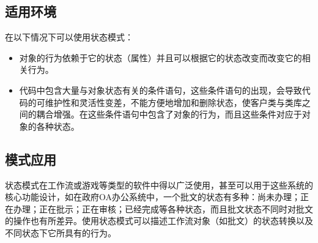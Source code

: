 \documentclass[letterpaper,10pt,english]{sphinxmanual}
\begin{document}
\subsection{适用环境}
\label{\detokenize{behavioral_patterns/state:id12}}
\sphinxAtStartPar
在以下情况下可以使用状态模式：
\begin{itemize}
\item {} 
\sphinxAtStartPar
对象的行为依赖于它的状态（属性）并且可以根据它的状态改变而改变它的相关行为。

\item {} 
\sphinxAtStartPar
代码中包含大量与对象状态有关的条件语句，这些条件语句的出现，会导致代码的可维护性和灵活性变差，不能方便地增加和删除状态，使客户类与类库之间的耦合增强。在这些条件语句中包含了对象的行为，而且这些条件对应于对象的各种状态。

\end{itemize}


\subsection{模式应用}
\label{\detokenize{behavioral_patterns/state:id13}}
\sphinxAtStartPar
状态模式在工作流或游戏等类型的软件中得以广泛使用，甚至可以用于这些系统的核心功能设计，如在政府OA办公系统中，一个批文的状态有多种：尚未办理；正在办理；正在批示；正在审核；已经完成等各种状态，而且批文状态不同时对批文的操作也有所差异。使用状态模式可以描述工作流对象（如批文）的状态转换以及不同状态下它所具有的行为。
\end{document}
